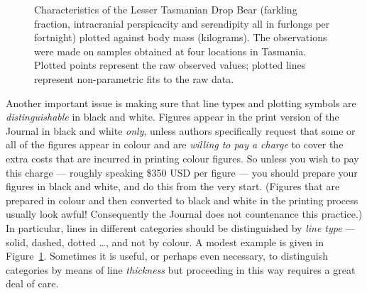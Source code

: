 \documentclass[times, doublespace]{anzsauth}
\begin{document}
\begin{figure}[htp]
\centering
{}
\caption{\label{fig:ltdb}
Characteristics of the Lesser Tasmanian Drop Bear (farkling
fraction, intracranial perspicacity and serendipity all in
furlongs per fortnight) plotted against body mass (kilograms).
The observations were made on samples obtained at four locations
in Tasmania. Plotted points represent the raw observed values;
plotted lines represent non-parametric fits to the raw data.}
\end{figure}

Another important issue is making sure that line types and
plotting symbols are \emph{distinguishable} in black and white.
Figures appear in the print version of the Journal in black and
white \emph{only}, unless authors specifically request that some or
all of the figures appear in colour and are \emph{willing to pay
a charge} to cover the extra costs that are incurred in printing
colour figures.  So unless you wish to pay this charge --- roughly
speaking \$350 USD per figure --- you should prepare your figures
in black and white, and do this from the very start. (Figures
that are prepared in colour and then converted to black and white
in the printing process usually look awful! Consequently the Journal
does not countenance this practice.)  In particular, lines in
different categories should be distinguished by \emph{line type}
--- solid, dashed, dotted \ldots, and not by colour.  A modest
example is given in Figure~\ref{fig:ltdb}.  Sometimes it is useful,
or perhaps even necessary, to distinguish categories by means of
line \emph{thickness} but proceeding in this way requires a great
deal of care.
\end{document}
